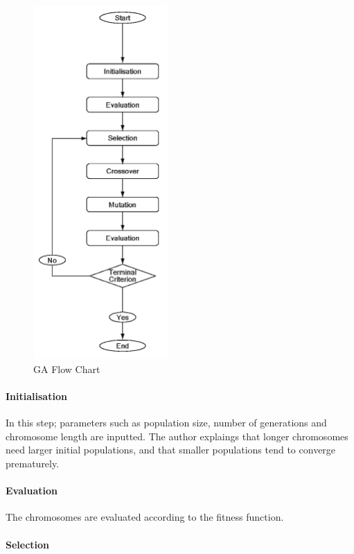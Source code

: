 \begin{figure}[htbp]
\centering
\includegraphics[height=13.5cm]{./Images/24-GoGALoop}
\caption[GA Flow Chart]{GA Flow Chart \cite{kawakita08}}
\label{fig:GoGAFC}
\end{figure}

\paragraph{Initialisation}\mbox{}

In this step; parameters such as population size, number of generations and chromosome length are inputted. The author explaings that longer chromosomes need larger initial populations, and that smaller populations tend to converge prematurely.

\paragraph{Evaluation}\mbox{}

The chromosomes are evaluated according to the fitness function.

\paragraph{Selection}\mbox{}

